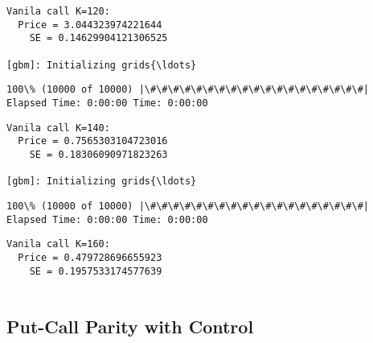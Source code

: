 \documentclass[11pt]{article}
\begin{document}
    \begin{Verbatim}[commandchars=\\\{\}]
Vanila call K=120:
  Price = 3.044323974221644
    SE = 0.14629904121306525

[gbm]: Initializing grids{\ldots}

    \end{Verbatim}

    \begin{Verbatim}[commandchars=\\\{\}]
100\% (10000 of 10000) |\#\#\#\#\#\#\#\#\#\#\#\#\#\#\#\#\#\#\#| Elapsed Time: 0:00:00 Time: 0:00:00

    \end{Verbatim}

    \begin{Verbatim}[commandchars=\\\{\}]
Vanila call K=140:
  Price = 0.7565303104723016
    SE = 0.18306090971823263

[gbm]: Initializing grids{\ldots}

    \end{Verbatim}

    \begin{Verbatim}[commandchars=\\\{\}]
100\% (10000 of 10000) |\#\#\#\#\#\#\#\#\#\#\#\#\#\#\#\#\#\#\#| Elapsed Time: 0:00:00 Time: 0:00:00

    \end{Verbatim}

    \begin{Verbatim}[commandchars=\\\{\}]
Vanila call K=160:
  Price = 0.479728696655923
    SE = 0.1957533174577639


    \end{Verbatim}

    \subsection{Put-Call Parity with
Control}\label{put-call-parity-with-control}
\end{document}
